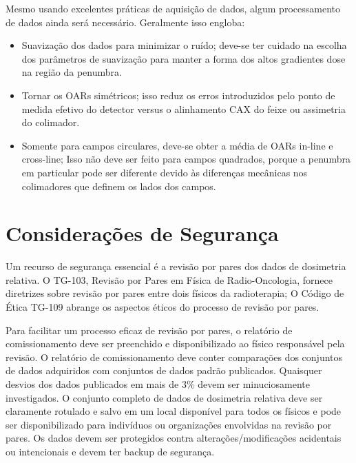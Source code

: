 \documentclass[11pt,a4paper]{article}
\begin{document}
	Mesmo usando excelentes práticas de aquisição de dados, algum processamento de dados ainda será necessário. Geralmente isso engloba:

	\begin{itemize}[label=\textcolor{CarnationPink}{$\blacktriangleright$}]
		\item Suavização dos dados para minimizar o ruído; deve-se ter cuidado na escolha dos parâmetros de suavização para manter a forma dos altos gradientes dose na região da penumbra.
		\item Tornar os OARs simétricos; isso reduz os erros introduzidos pelo ponto de medida efetivo do detector versus o alinhamento CAX do feixe ou assimetria do colimador.
		\item Somente para campos circulares, deve-se obter a média de OARs in-line e cross-line; Isso não deve ser feito para campos quadrados, porque a penumbra em particular pode ser diferente devido às diferenças mecânicas nos colimadores que definem os lados dos campos.
	\end{itemize}

\section{Considerações de Segurança}

	Um recurso de segurança essencial é a revisão por pares dos dados de dosimetria relativa. O TG-103, Revisão por Pares em Física de Radio-Oncologia, fornece diretrizes sobre revisão por pares entre dois físicos da radioterapia; O Código de Ética TG-109 abrange os aspectos éticos do processo de revisão por pares.

	Para facilitar um processo eficaz de revisão por pares, o relatório de comissionamento deve ser preenchido e disponibilizado ao físico responsável pela revisão. O relatório de comissionamento deve conter comparações dos conjuntos de dados adquiridos com conjuntos de dados padrão publicados. Quaisquer desvios dos dados publicados em mais de 3\% devem ser minuciosamente investigados. O conjunto completo de dados de dosimetria relativa deve ser claramente rotulado e salvo em um local disponível para todos os físicos e pode ser disponibilizado para indivíduos ou organizações envolvidas na revisão por pares. Os dados devem ser protegidos contra alterações/modificações acidentais ou intencionais e devem ter backup de segurança.


\end{document}
